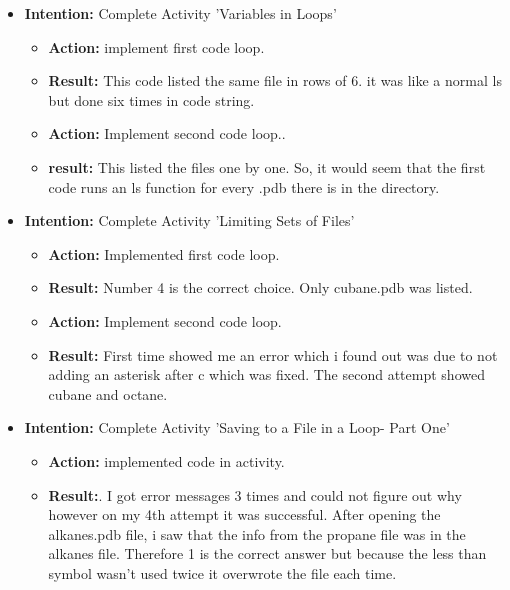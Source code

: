 \documentclass{article}
\begin{document}
\date{1/09/2019 17:00}
\begin{itemize}

\item{\textbf{Intention:} Complete Activity 'Variables in Loops'}


\begin{itemize}
\item{\textbf{Action:} implement first code loop.}

\item{\textbf{Result:} This code listed the same file in rows of 6. it was like a normal ls but done six times in code string.}

\item{\textbf{Action:}  Implement second code loop..}

\item{\textbf{result:} This listed the files one by one. So, it would seem that the first code runs an ls function for every .pdb there is in the directory.}

\end{itemize}

\item{\textbf{Intention:} Complete Activity 'Limiting Sets of Files'}

\begin{itemize}
\item{\textbf{Action:} Implemented first code loop.}

\item{\textbf{Result:} Number 4 is the correct choice. Only cubane.pdb was listed.}

\item{\textbf{Action:} Implement second code loop.}

\item{\textbf{Result:} First time showed me an error which i found out was due to not adding an asterisk after c which was fixed. The second attempt showed cubane and octane.}


\end{itemize}

\item{\textbf{Intention:} Complete Activity 'Saving to a File in a Loop- Part One'}

\begin{itemize}
\item{\textbf{Action:} implemented code in activity.}

\item{\textbf{Result:}. I got error messages 3 times and could not figure out why however on my 4th attempt it was successful. After opening the alkanes.pdb file, i saw that the info from the propane file was in the alkanes file. Therefore 1 is the correct answer but because the less than symbol wasn't used twice it overwrote the file each time.}


\end{itemize}
\end{itemize}
\end{document}
